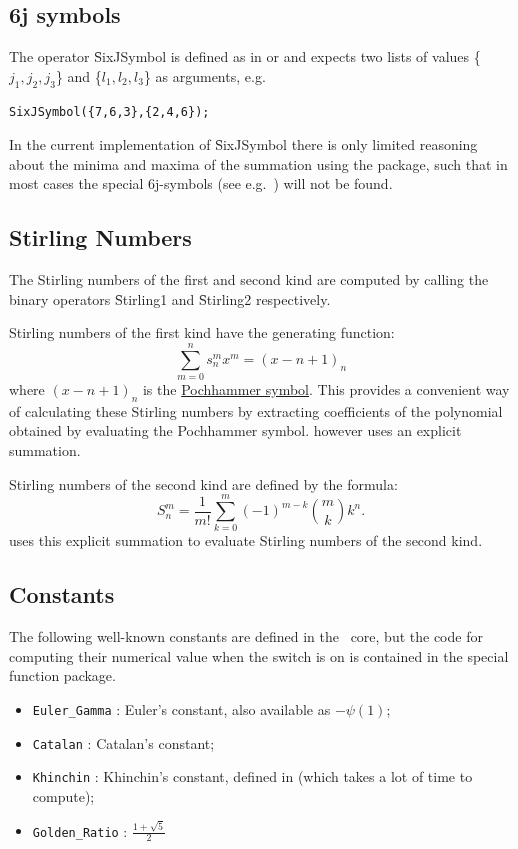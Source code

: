 \subsection{6j symbols }
\hypertarget{operator:SixJSymbol}{}
The operator \f{SixJSymbol} is defined as
in \cite{LandoltBoernstein:68} or \cite{Edmonds:57} and
expects two lists of values \{$j_1,j_2,j_3$\} and
\{$l_1,l_2,l_3$\} as arguments, e.g.
\begin{verbatim}
SixJSymbol({7,6,3},{2,4,6});
\end{verbatim}

In the current implementation of \f{SixJSymbol} there is only limited
reasoning about the minima and maxima of the summation using
the  package, such that in most
cases the special 6j-symbols (see e.g.\ \cite{LandoltBoernstein:68})
will not be found.

\subsection{Stirling Numbers}
\hypertarget{STIRL}{}
\hypertarget{operator:STIRLING1}{}
\hypertarget{operator:STIRLING2}{}
The Stirling numbers of the first and second kind are computed
by calling the binary operators \f{Stirling1} and \f{Stirling2}
respectively.

Stirling numbers of the first kind have the generating function:
\[\sum_{m=0}^n s_n^m x^m  =  (x-n+1)_n\]
where $(x-n+1)_n$ is the \hyperlink{POCH}{Pochhammer symbol}. This provides
a convenient way of calculating these Stirling numbers by
extracting coefficients of the polynomial obtained by evaluating the
Pochhammer symbol.  \REDUCE however uses an explicit summation.

Stirling numbers of the second kind are defined by the formula:
\[S_n^m = \frac{1}{m!} \sum_{k=0}^m (-1)^{m-k} \binom{m}{k} k^n.\]
\REDUCE uses this explicit summation to evaluate Stirling numbers of the
second kind.

\subsection{Constants}
\hypertarget{CONSTS}{}
%
%

The following well-known constants are defined in the \REDUCE\ core,
but the code for computing their numerical value when the switch 
is on is contained in the special function package.
\begin{itemize}
\item \texttt{Euler\_Gamma} : Euler's constant, also available as $-\psi(1)$;
\item \texttt{Catalan} : Catalan's constant;
\item \texttt{Khinchin} : Khinchin's constant, defined in \cite{Khinchin:64}
(which takes a lot of time to compute);
\item \texttt{Golden\_Ratio} : $\displaystyle\frac{1 + \sqrt{5}}{2}$
\end{itemize}


